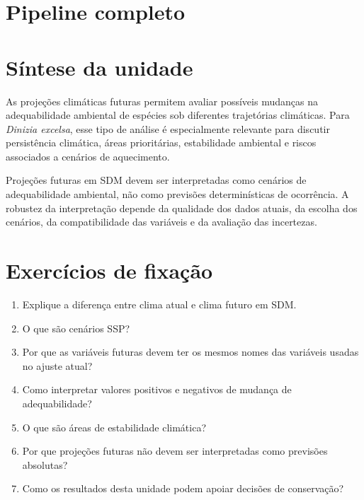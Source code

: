 \documentclass{ueap-sdm}
\begin{document}
\section{Pipeline completo}


\section{Síntese da unidade}

As projeções climáticas futuras permitem avaliar possíveis mudanças na adequabilidade ambiental de espécies sob diferentes trajetórias climáticas. Para \textit{Dinizia excelsa}, esse tipo de análise é especialmente relevante para discutir persistência climática, áreas prioritárias, estabilidade ambiental e riscos associados a cenários de aquecimento.

\begin{conceito}[title={\faBook\quad Mensagem central}]
	Projeções futuras em SDM devem ser interpretadas como cenários de adequabilidade ambiental, não como previsões determinísticas de ocorrência. A robustez da interpretação depende da qualidade dos dados atuais, da escolha dos cenários, da compatibilidade das variáveis e da avaliação das incertezas.
\end{conceito}

\section{Exercícios de fixação}

\begin{enumerate}
	\item Explique a diferença entre clima atual e clima futuro em SDM.
	\item O que são cenários SSP?
	\item Por que as variáveis futuras devem ter os mesmos nomes das variáveis usadas no ajuste atual?
	\item Como interpretar valores positivos e negativos de mudança de adequabilidade?
	\item O que são áreas de estabilidade climática?
	\item Por que projeções futuras não devem ser interpretadas como previsões absolutas?
	\item Como os resultados desta unidade podem apoiar decisões de conservação?
\end{enumerate}
\end{document}
